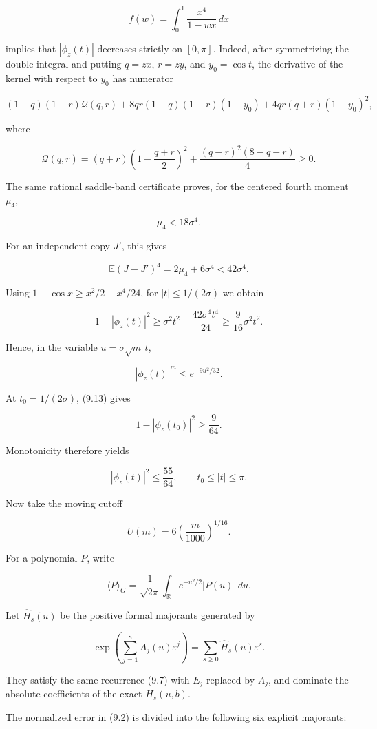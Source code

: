 \documentclass[11pt]{article}
\numberwithin{equation}{section}
\begin{document}
\[
f(w)=\int_0^1\frac{x^4}{1-wx}\,dx
\]

implies that $|\phi_z(t)|$ decreases strictly on $[0,\pi]$. Indeed, after symmetrizing
the double integral and putting $q=zx$, $r=zy$, and $y_0=\cos t$, the derivative of
the kernel with respect to $y_0$ has numerator

\[
(1-q)(1-r)\mathcal Q(q,r)
+8qr(1-q)(1-r)(1-y_0)+4qr(q+r)(1-y_0)^2,
\]

where

\[
\mathcal Q(q,r)=
(q+r)\left(1-\frac{q+r}{2}\right)^2
+\frac{(q-r)^2(8-q-r)}4\ge0.
\]

The same rational saddle-band certificate proves, for the centered fourth moment
$\mu_4$,

\[
\mu_4<18\sigma^4.
\tag{9.12}
\]

For an independent copy $J'$, this gives

\[
\mathbb E(J-J')^4=2\mu_4+6\sigma^4<42\sigma^4.
\]

Using $1-\cos x\ge x^2/2-x^4/24$, for $|t|\le1/(2\sigma)$ we obtain

\[
1-|\phi_z(t)|^2
\ge\sigma^2t^2-\frac{42\sigma^4t^4}{24}
\ge\frac9{16}\sigma^2t^2.
\tag{9.13}
\]

Hence, in the variable $u=\sigma\sqrt m\,t$,

\[
|\phi_z(t)|^m\le e^{-9u^2/32}.
\tag{9.14}
\]

At $t_0=1/(2\sigma)$, (9.13) gives

\[
1-|\phi_z(t_0)|^2\ge\frac9{64}.
\]

Monotonicity therefore yields

\[
|\phi_z(t)|^2\le\frac{55}{64},
\qquad
t_0\le|t|\le\pi.
\tag{9.15}
\]

Now take the moving cutoff

\[
U(m)=6\left(\frac{m}{1000}\right)^{1/16}.
\tag{9.16}
\]

For a polynomial $P$, write

\[
\langle P\rangle_G=
\frac1{\sqrt{2\pi}}\int_{\mathbb R}e^{-u^2/2}|P(u)|\,du.
\]

Let $\widehat H_s(u)$ be the positive formal majorants generated by

\[
\exp\left(\sum_{j=1}^{8}A_j(u)\varepsilon^j\right)
=\sum_{s\ge0}\widehat H_s(u)\varepsilon^s.
\]

They satisfy the same recurrence (9.7) with $E_j$ replaced by $A_j$, and dominate the
absolute coefficients of the exact $H_s(u,b)$.

The normalized error in (9.2) is divided into the following six explicit majorants:
\end{document}
